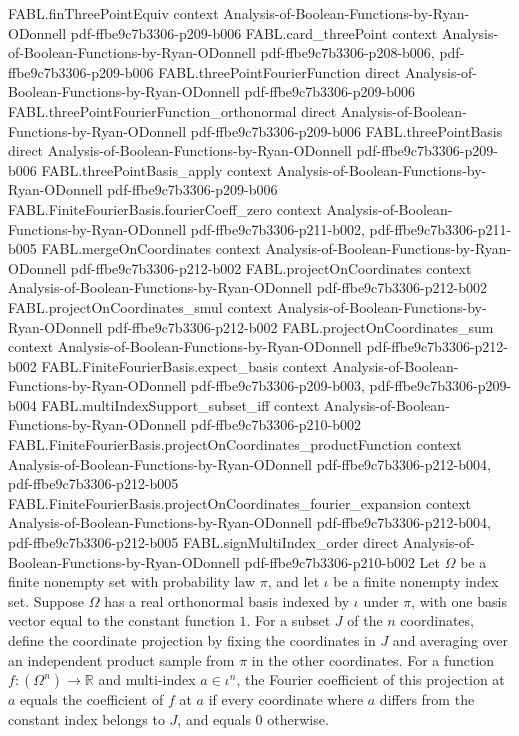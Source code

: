 \begin{theorem}
\proofstep
  {FABL.finThreePointEquiv}
  {context}
  {Analysis-of-Boolean-Functions-by-Ryan-ODonnell}
  {pdf-ffbe9c7b3306-p209-b006}
\proofstep
  {FABL.card_threePoint}
  {context}
  {Analysis-of-Boolean-Functions-by-Ryan-ODonnell}
  {pdf-ffbe9c7b3306-p208-b006,
    pdf-ffbe9c7b3306-p209-b006}
\proofstep
  {FABL.threePointFourierFunction}
  {direct}
  {Analysis-of-Boolean-Functions-by-Ryan-ODonnell}
  {pdf-ffbe9c7b3306-p209-b006}
\proofstep
  {FABL.threePointFourierFunction_orthonormal}
  {direct}
  {Analysis-of-Boolean-Functions-by-Ryan-ODonnell}
  {pdf-ffbe9c7b3306-p209-b006}
\proofstep
  {FABL.threePointBasis}
  {direct}
  {Analysis-of-Boolean-Functions-by-Ryan-ODonnell}
  {pdf-ffbe9c7b3306-p209-b006}
\proofstep
  {FABL.threePointBasis_apply}
  {context}
  {Analysis-of-Boolean-Functions-by-Ryan-ODonnell}
  {pdf-ffbe9c7b3306-p209-b006}
\proofstep
  {FABL.FiniteFourierBasis.fourierCoeff_zero}
  {context}
  {Analysis-of-Boolean-Functions-by-Ryan-ODonnell}
  {pdf-ffbe9c7b3306-p211-b002,
    pdf-ffbe9c7b3306-p211-b005}
\proofstep
  {FABL.mergeOnCoordinates}
  {context}
  {Analysis-of-Boolean-Functions-by-Ryan-ODonnell}
  {pdf-ffbe9c7b3306-p212-b002}
\proofstep
  {FABL.projectOnCoordinates}
  {context}
  {Analysis-of-Boolean-Functions-by-Ryan-ODonnell}
  {pdf-ffbe9c7b3306-p212-b002}
\proofstep
  {FABL.projectOnCoordinates_smul}
  {context}
  {Analysis-of-Boolean-Functions-by-Ryan-ODonnell}
  {pdf-ffbe9c7b3306-p212-b002}
\proofstep
  {FABL.projectOnCoordinates_sum}
  {context}
  {Analysis-of-Boolean-Functions-by-Ryan-ODonnell}
  {pdf-ffbe9c7b3306-p212-b002}
\proofstep
  {FABL.FiniteFourierBasis.expect_basis}
  {context}
  {Analysis-of-Boolean-Functions-by-Ryan-ODonnell}
  {pdf-ffbe9c7b3306-p209-b003,
    pdf-ffbe9c7b3306-p209-b004}
\proofstep
  {FABL.multiIndexSupport_subset_iff}
  {context}
  {Analysis-of-Boolean-Functions-by-Ryan-ODonnell}
  {pdf-ffbe9c7b3306-p210-b002}
\proofstep
  {FABL.FiniteFourierBasis.projectOnCoordinates_productFunction}
  {context}
  {Analysis-of-Boolean-Functions-by-Ryan-ODonnell}
  {pdf-ffbe9c7b3306-p212-b004,
    pdf-ffbe9c7b3306-p212-b005}
\proofstep
  {FABL.FiniteFourierBasis.projectOnCoordinates_fourier_expansion}
  {context}
  {Analysis-of-Boolean-Functions-by-Ryan-ODonnell}
  {pdf-ffbe9c7b3306-p212-b004,
    pdf-ffbe9c7b3306-p212-b005}
\proofstep
  {FABL.signMultiIndex_order}
  {direct}
  {Analysis-of-Boolean-Functions-by-Ryan-ODonnell}
  {pdf-ffbe9c7b3306-p210-b002}
Let $\Omega$ be a finite nonempty set with probability law $\pi$, and let $\iota$ be a
finite nonempty index set. Suppose $\Omega$ has a real orthonormal basis indexed by
$\iota$ under $\pi$, with one basis vector equal to the constant function $1$. For a
subset $J$ of the $n$ coordinates, define the coordinate projection by fixing the
coordinates in $J$ and averaging over an independent product sample from $\pi$ in the
other coordinates. For a function $f:(\Omega^n)\to\mathbb R$ and multi-index
$a\in\iota^n$, the Fourier coefficient of this projection at $a$ equals the coefficient
of $f$ at $a$ if every coordinate where $a$ differs from the constant index belongs to
$J$, and equals $0$ otherwise.
\end{theorem}

